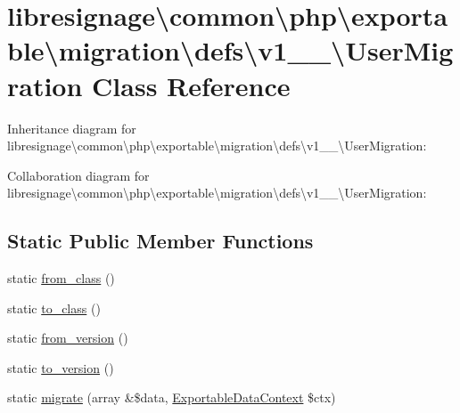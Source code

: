 \hypertarget{classlibresignage_1_1common_1_1php_1_1exportable_1_1migration_1_1defs_1_1v1__0__0_1_1UserMigration}{}\section{libresignage\textbackslash{}common\textbackslash{}php\textbackslash{}exportable\textbackslash{}migration\textbackslash{}defs\textbackslash{}v1\+\_\+\_\textbackslash{}User\+Migration Class Reference}
\label{classlibresignage_1_1common_1_1php_1_1exportable_1_1migration_1_1defs_1_1v1__0__0_1_1UserMigration}


Inheritance diagram for libresignage\textbackslash{}common\textbackslash{}php\textbackslash{}exportable\textbackslash{}migration\textbackslash{}defs\textbackslash{}v1\+\_\+\_\textbackslash{}User\+Migration\+:


Collaboration diagram for libresignage\textbackslash{}common\textbackslash{}php\textbackslash{}exportable\textbackslash{}migration\textbackslash{}defs\textbackslash{}v1\+\_\+\_\textbackslash{}User\+Migration\+:
\subsection*{Static Public Member Functions}
\begin{DoxyCompactItemize}
\item 
static \hyperlink{classlibresignage_1_1common_1_1php_1_1exportable_1_1migration_1_1defs_1_1v1__0__0_1_1UserMigration_a560c453a9befc1eb97308e0d91183f35}{from\+\_\+class} ()
\item 
static \hyperlink{classlibresignage_1_1common_1_1php_1_1exportable_1_1migration_1_1defs_1_1v1__0__0_1_1UserMigration_ab2641b8685911589dde7ab064f00b7d4}{to\+\_\+class} ()
\item 
static \hyperlink{classlibresignage_1_1common_1_1php_1_1exportable_1_1migration_1_1defs_1_1v1__0__0_1_1UserMigration_a30e82a04399d4eb80a69f1ac99b44fed}{from\+\_\+version} ()
\item 
static \hyperlink{classlibresignage_1_1common_1_1php_1_1exportable_1_1migration_1_1defs_1_1v1__0__0_1_1UserMigration_ace8b9b29fe930534760ce4c51b7273a4}{to\+\_\+version} ()
\item 
static \hyperlink{classlibresignage_1_1common_1_1php_1_1exportable_1_1migration_1_1defs_1_1v1__0__0_1_1UserMigration_af3018ee63854787ebaa630b949816a42}{migrate} (array \&\$data, \hyperlink{classlibresignage_1_1common_1_1php_1_1exportable_1_1ExportableDataContext}{Exportable\+Data\+Context} \$ctx)
\end{DoxyCompactItemize}


